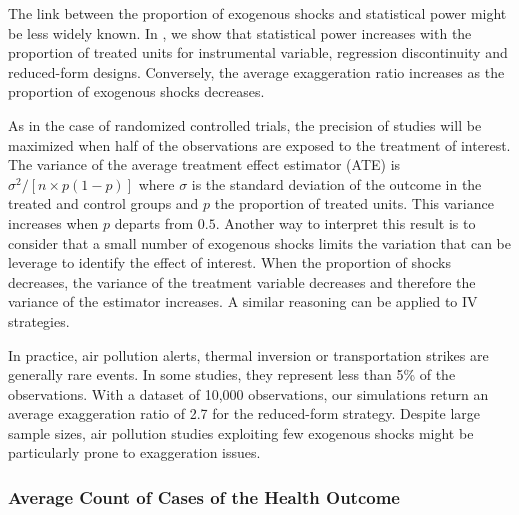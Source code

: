 \documentclass[12pt]{article}
\begin{document}
            The link between the proportion of exogenous shocks and statistical power might be less widely known. In , we show that statistical power increases with the proportion of treated units for instrumental variable, regression discontinuity and reduced-form designs. Conversely, the average exaggeration ratio increases as the proportion of exogenous shocks decreases. 
            
            As in the case of randomized controlled trials, the precision of studies will be maximized when half of the observations are exposed to the treatment of interest. The variance of the average treatment effect estimator (ATE) is $\sigma^2/[n\times p(1 - p)]$ where $\sigma$ is the standard deviation of the outcome in the treated and control groups and $p$ the proportion of treated units. This variance increases when $p$ departs from $0.5$. Another way to interpret this result is to consider that a small number of exogenous shocks limits the variation that can be leverage to identify the effect of interest. When the proportion of shocks decreases, the variance of the treatment variable decreases and therefore the variance of the estimator increases. A similar reasoning can be applied to IV strategies.
           
            In practice, air pollution alerts, thermal inversion or transportation strikes are generally rare events. In some studies, they represent less than 5\% of the observations. With a dataset of 10,000 observations, our simulations return an average exaggeration ratio of 2.7 for the reduced-form strategy. Despite large sample sizes, air pollution studies exploiting few exogenous shocks might be particularly prone to exaggeration issues.
            
        \subsubsection*{Average Count of Cases of the Health Outcome}
    
            
\end{document}

